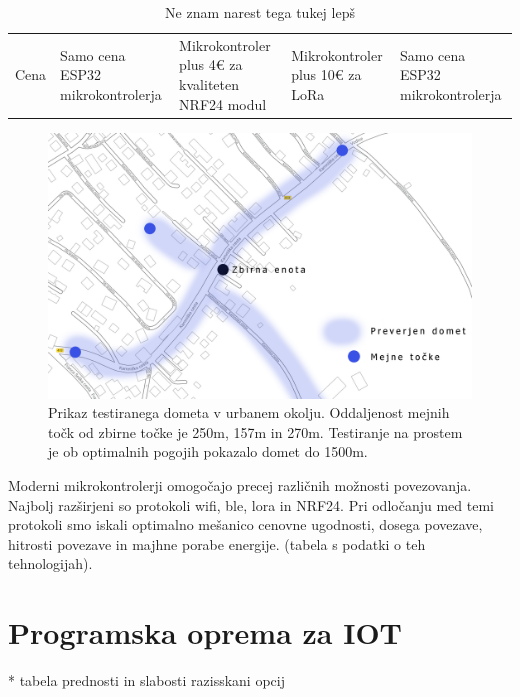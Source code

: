 \documentclass[a4paper, 12pt]{book}
\begin{document}
\begin{table}[H]
\begin{tabular}{l|llll}
Cena            & Samo cena ESP32 mikrokontrolerja                                                                                                & Mikrokontroler plus 4€ za kvaliteten NRF24 modul                                                                                                                                               & Mikrokontroler plus 10€ za LoRa                                                                             & Samo cena ESP32 mikrokontrolerja
\end{tabular}

\caption{Ne znam narest  tega tukej lepš}
\label{tbl:primerjava_povezljivosti}
\end{table}


\begin{figure}[H]
    \centering
    \includegraphics[width=\linewidth]{slikovno_gradivo/Domet.png}
    \caption{Prikaz testiranega dometa v urbanem okolju. Oddaljenost mejnih točk od zbirne točke je 250m, 157m in 270m. Testiranje na prostem je ob optimalnih pogojih pokazalo domet do 1500m.}
    \label{fig:INMP441}
\end{figure}

Moderni mikrokontrolerji omogočajo precej različnih možnosti povezovanja. Najbolj razširjeni so protokoli wifi, ble, lora in NRF24. Pri odločanju med temi protokoli smo iskali optimalno mešanico cenovne ugodnosti, dosega povezave, hitrosti povezave in majhne porabe energije. (tabela s podatki o teh tehnologijah).

\section{Programska oprema za IOT}

* tabela prednosti in slabosti razisskani opcij
\end{document}
